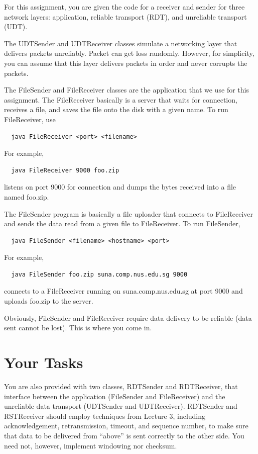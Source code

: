 \documentclass[a4paper,11pt]{exam}
\begin{document}
For this assignment, you are given the code for a receiver and sender for three network layers: application, reliable transport (RDT), and unreliable transport (UDT).

The UDTSender and UDTReceiver classes simulate a networking layer that delivers packets unreliably.  Packet can get loss randomly.  However, for simplicity, you can assume that this layer delivers packets in order and never corrupts the packets.

The FileSender and FileReceiver classes are the application that we use for this assignment.  The FileReceiver basically is a server that waits for connection, receives a file, and saves the file onto the disk with a given name.  To run FileReceiver, use
\begin{verbatim}
  java FileReceiver <port> <filename>
\end{verbatim}
For example,
\begin{verbatim}
  java FileReceiver 9000 foo.zip
\end{verbatim}
listens on port 9000 for connection and dumps the bytes received into a file named foo.zip.

The FileSender program is basically a file uploader that connects to FileReceiver and sends the data read from a given file to FileReceiver.  To run FileSender, 
\begin{verbatim}
  java FileSender <filename> <hostname> <port>
\end{verbatim}
For example, 
\begin{verbatim}
  java FileSender foo.zip suna.comp.nus.edu.sg 9000
\end{verbatim}
connects to a FileReceiver running on suna.comp.nus.edu.sg at port 9000 and uploads foo.zip to the server.

Obviously, FileSender and FileReceiver require data delivery to be reliable (data sent cannot be lost).  This is where you come in.  

\section*{Your Tasks}

You are also provided with two classes, RDTSender and RDTReceiver, that interface between the application (FileSender and FileReceiver) and the unreliable data transport (UDTSender and UDTReceiver).  RDTSender and RSTReceiver should employ techniques from Lecture 3, including acknowledgement, retransmission, timeout, and sequence number, to make sure that data to be delivered from ``above'' is sent correctly to the other side.   You need not, however, implement windowing nor checksum.
\end{document}
